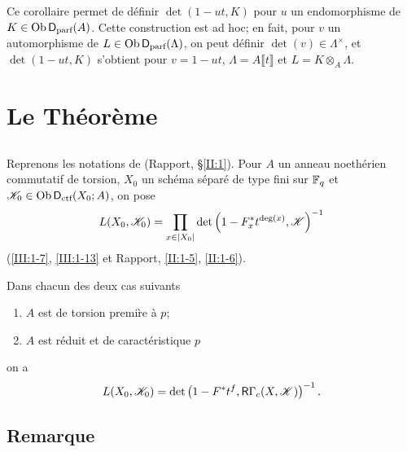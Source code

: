 Ce corollaire permet de définir $\det(1-u t,K)$ pour $u$ un endomorphisme de 
$K\in \operatorname{Ob}\mathsf{D}_\text{parf}(A)$. Cette construction est ad hoc; en fait, pour $v$ un 
automorphisme de $L\in\operatorname{Ob}\mathsf{D}_\text{parf}(\Lambda)$, on peut définir 
$\det(v)\in\Lambda^\times$, et $\det(1-u t,K)$ s'obtient pour $v=1-u t$, 
$\Lambda=A\llbracket t\rrbracket$ et $L=K\otimes_A\Lambda$. 










\section{Le Théorème}\label{III:2}





\subsection{}\label{III:2-1}

Reprenons les notations de (Rapport, \S\ref{II:1}). Pour $A$ un anneau 
noethérien commutatif de torsion, $X_0$ un schéma séparé de type fini sur 
$\mathbb{F}_q$ et $\mathscr{K}_0\in\operatorname{Ob}\mathsf{D}_\text{ctf}(X_0;A)$, on pose 
\[
  L(X_0,\mathscr{K}_0) = \prod_{x\in |X_0|} \det\left(1-F_x^* t^{\deg(x)}, \mathscr{K}\right)^{-1}
\]
(\ref{III:1-7}, \ref{III:1-13} et Rapport, \ref{II:1-5}, \ref{II:1-6}). 





\begin{theorem_}\label{III:2-2}
Dans chacun des deux cas suivants
\begin{enumerate}[\indent a)]
  \item $A$ est de torsion premi\`re à $p$;
  \item $A$ est réduit et de caractéristique $p$
\end{enumerate}
on a 
\begin{equation}\label{III:eq:2-2-1}
  L(X_0,\mathscr{K}_0) = \det\left(1-F^* t^f, \mathsf{R}\Gamma_c(X,\mathscr{K})\right)^{-1} \text{.}
\end{equation}
\end{theorem_}





\subsection{Remarque}\label{III:2-3}

